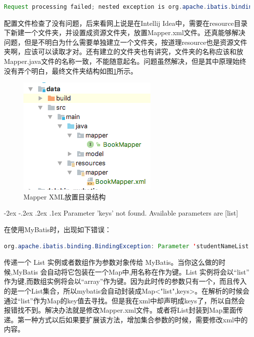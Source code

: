 \documentclass[11pt,fleqn]{book}
\makeatletter
\numberwithin{dummy}{section}
\theoremstyle{ocrenumbox}
\theoremstyle{blacknumex}
\theoremstyle{blacknumbox}
\theoremstyle{ocrenum}
\renewcommand\paragraph{\@startsection{paragraph}{4}{\z@}
	{-2ex \@plus-.2ex \@minus .2ex}
	{.1ex}
	{\normalfont\small\sffamily\bfseries}}
\makeatother
\begin{document}
\begin{lstlisting}[language=Java]
Request processing failed; nested exception is org.apache.ibatis.binding.BindingException: Invalid bound statement (not found)
\end{lstlisting}

配置文件检查了没有问题，后来看网上说是在Intellij Idea中，需要在resource目录下新建一个文件夹，并设置成资源文件夹，放置Mapper.xml文件。还真能够解决问题，但是不明白为什么需要单独建立一个文件夹，按道理resource也是资源文件夹啊，应该可以读取才对。还有建立的文件夹也有讲究，文件夹的名称应该和放Mapper.java文件的名称一致，不能随意起名。问题虽然解决，但是其中原理始终没有弄个明白，最终文件夹结构如图\ref{fig:mapperreourcestructure}所示。

\begin{figure}[htbp]
	\centering
	\includegraphics[scale=0.7]{mapperreourcestructure.png}
	\caption{Mapper XML放置目录结构}
	\label{fig:mapperreourcestructure}
\end{figure}


\paragraph{Parameter 'keys' not found. Available parameters are [list]}

在使用MyBatis时，出现如下错误：

\begin{lstlisting}[language=Java]
org.apache.ibatis.binding.BindingException: Parameter 'studentNameList' not found. Available parameters are [list]
\end{lstlisting}

传递一个 List 实例或者数组作为参数对象传给 MyBatis。当你这么做的时 候,MyBatis 会自动将它包装在一个Map中,用名称在作为键。List 实例将会以“list” 作为键,而数组实例将会以“array”作为键。因为此时传的参数只有一个，而且传入的是一个List集合，所以mybatis会自动封装成Map<"list",keys>。在解析的时候会通过“list”作为Map的key值去寻找。但是我在xml中却声明成keys了，所以自然会报错找不到。解决办法就是修改Mapper.xml文件。或者将List封装到Map里面传递。第一种方式以后如果要扩展该方法，增加集合参数的时候，需要修改xml中的内容。
\end{document}
